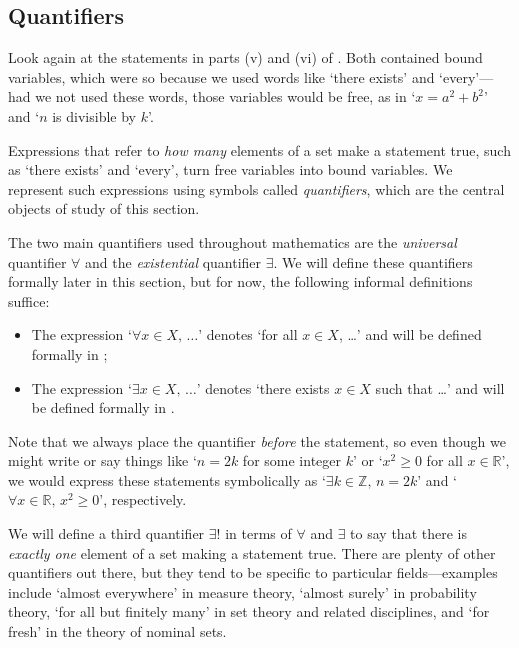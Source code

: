 \subsection*{Quantifiers}

Look again at the statements in parts (v) and (vi) of . Both contained bound variables, which were so because we used words like `there exists' and `every'---had we not used these words, those variables would be free, as in `$x=a^2+b^2$' and `$n$ is divisible by $k$'.

Expressions that refer to \textit{how many} elements of a set make a statement true, such as `there exists' and `every', turn free variables into bound variables. We represent such expressions using symbols called \textit{quantifiers}, which are the central objects of study of this section.

The two main quantifiers used throughout mathematics are the \textit{universal} quantifier $\forall$ and the \textit{existential} quantifier $\exists$. We will define these quantifiers formally later in this section, but for now, the following informal definitions suffice:

\begin{itemize}
\item The expression `$\forall x \in X,\, \dots{}$' denotes `for all $x \in X$, \dots{}' and will be defined formally in ;
\item The expression `$\exists x \in X,\, \dots{}$' denotes `there exists $x \in X$ such that \dots{}' and will be defined formally in .
\end{itemize}

Note that we always place the quantifier \textit{before} the statement, so even though we might write or say things like `$n=2k$ for some integer $k$' or `$x^2 \ge 0$ for all $x \in \mathbb{R}$', we would express these statements symbolically as `$\exists k \in \mathbb{Z},\, n=2k$' and `$\forall x \in \mathbb{R},\, x^2 \ge 0$', respectively.

We will define a third quantifier $\exists !$ in terms of $\forall$ and $\exists$ to say that there is \textit{exactly one} element of a set making a statement true. There are plenty of other quantifiers out there, but they tend to be specific to particular fields---examples include `almost everywhere' in measure theory, `almost surely' in probability theory, `for all but finitely many' in set theory and related disciplines, and `for fresh' in the theory of nominal sets.

